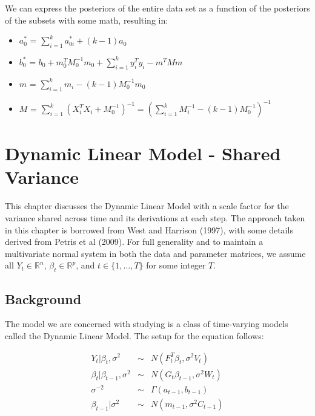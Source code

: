 \documentclass[
]{book}
\providecommand{\tightlist}{%
  \setlength{\itemsep}{0pt}\setlength{\parskip}{0pt}}
\theoremstyle{definition}
\theoremstyle{definition}
\theoremstyle{definition}
\theoremstyle{definition}
\theoremstyle{remark}
\begin{document}
We can express the posteriors of the entire data set as a function of the posteriors of the subsets with some math, resulting in:

\begin{itemize}
\tightlist
\item
  \(a_0^{*}\) = \(\sum_{i=1}^{k} a_{0i}^{*} + (k-1)a_0\)
\item
  \(b_0^{*}\) = \(b_0 + m_0^{T}M^{-1}_0 m_0 + \sum_{i=1}^{k}y_i^{T}y_i - m^{T}Mm\)\\
\item
  \(m\) = \(\sum_{i=1}^{k}m_i - (k-1)M^{-1}_0m_0\)\\
\item
  \(M\) = \(\sum_{i=1}^{k}(X_i^{T}X_i + M^{-1}_0)^{-1} = (\sum_{i=1}^{k}M^{-1}_i - (k-1)M^{-1}_0)^{-1}\)
\end{itemize}

\hypertarget{dynamic-linear-model---shared-variance}{%
\chapter{Dynamic Linear Model - Shared Variance}\label{dynamic-linear-model---shared-variance}}

This chapter discusses the Dynamic Linear Model with a scale factor for the variance shared across time and its derivations at each step. The approach taken in this chapter is borrowed from West and Harrison (1997), with some details derived from Petris et al (2009). For full generality and to maintain a multivariate normal system in both the data and parameter matrices, we assume all \(Y_{t} \in \mathbb{R}^{n}\), \(\beta_{t} \in \mathbb{R}^{p}\), and \(t \in \{1,\ldots,T\}\) for some integer \(T\).

\hypertarget{background}{%
\section{Background}\label{background}}

The model we are concerned with studying is a class of time-varying models called the Dynamic Linear Model. The setup for the equation follows:

\begin{eqnarray*}
Y_{t}\vert\beta_{t}, \sigma^{2} &\sim& N(F_{t}^{T}\beta_{t}, \sigma^{2}V_{t})\\
\beta_{t}\vert \beta_{t-1},\sigma^{2} &\sim& N(G_{t}\beta_{t-1}, \sigma^{2}W_{t})\\
\sigma^{-2} &\sim& \Gamma(a_{t-1},b_{t-1})\\
\beta_{t-1}\vert \sigma^{2} &\sim& N(m_{t-1}, \sigma^{2}C_{t-1})\\
\end{eqnarray*}
\end{document}
